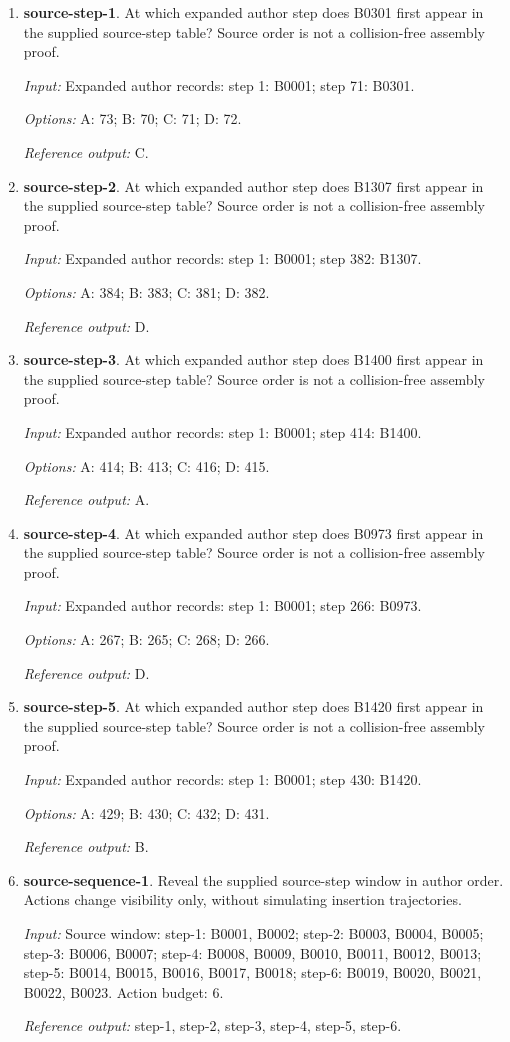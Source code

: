 \begin{enumerate}
\item \textbf{source-step-1}. At which expanded author step does B0301 first appear in the supplied source-step table? Source order is not a collision-free assembly proof.\par {\small \textit{Input:} Expanded author records: step 1: B0001; step 71: B0301. \par\textit{Options:} A: 73; B: 70; C: 71; D: 72. \par\textit{Reference output:} C.}
\item \textbf{source-step-2}. At which expanded author step does B1307 first appear in the supplied source-step table? Source order is not a collision-free assembly proof.\par {\small \textit{Input:} Expanded author records: step 1: B0001; step 382: B1307. \par\textit{Options:} A: 384; B: 383; C: 381; D: 382. \par\textit{Reference output:} D.}
\item \textbf{source-step-3}. At which expanded author step does B1400 first appear in the supplied source-step table? Source order is not a collision-free assembly proof.\par {\small \textit{Input:} Expanded author records: step 1: B0001; step 414: B1400. \par\textit{Options:} A: 414; B: 413; C: 416; D: 415. \par\textit{Reference output:} A.}
\item \textbf{source-step-4}. At which expanded author step does B0973 first appear in the supplied source-step table? Source order is not a collision-free assembly proof.\par {\small \textit{Input:} Expanded author records: step 1: B0001; step 266: B0973. \par\textit{Options:} A: 267; B: 265; C: 268; D: 266. \par\textit{Reference output:} D.}
\item \textbf{source-step-5}. At which expanded author step does B1420 first appear in the supplied source-step table? Source order is not a collision-free assembly proof.\par {\small \textit{Input:} Expanded author records: step 1: B0001; step 430: B1420. \par\textit{Options:} A: 429; B: 430; C: 432; D: 431. \par\textit{Reference output:} B.}
\item \textbf{source-sequence-1}. Reveal the supplied source-step window in author order. Actions change visibility only, without simulating insertion trajectories.\par {\small \textit{Input:} Source window: step-1: B0001, B0002; step-2: B0003, B0004, B0005; step-3: B0006, B0007; step-4: B0008, B0009, B0010, B0011, B0012, B0013; step-5: B0014, B0015, B0016, B0017, B0018; step-6: B0019, B0020, B0021, B0022, B0023. Action budget: 6. \par\textit{Reference output:} step-1, step-2, step-3, step-4, step-5, step-6.}

\end{enumerate}
